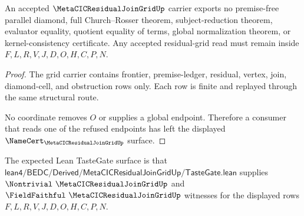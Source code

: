\begin{theorem}
\label{thm:metacic-residual-join-grid-nonescape}
An accepted $\MetaCICResidualJoinGridUp$ carrier exports no premise-free parallel diamond, full Church--Rosser theorem, subject-reduction theorem, evaluator equality, quotient equality of terms, global normalization theorem, or kernel-consistency certificate. Any accepted residual-grid read must remain inside $F,L,R,V,J,D,O,H,C,P,N$.
\end{theorem}
\begin{proof}
The grid carrier contains frontier, premise-ledger, residual, vertex, join, diamond-cell, and obstruction rows only. Each row is finite and replayed through the same structural route.

No coordinate removes $O$ or supplies a global endpoint. Therefore a consumer that reads one of the refused endpoints has left the displayed $\NameCert_{\MetaCICResidualJoinGridUp}$ surface.
\end{proof}



The expected Lean TasteGate surface is that $\mathsf{lean4/BEDC/Derived/MetaCICResidualJoinGridUp/TasteGate.lean}$ supplies $\Nontrivial\ \MetaCICResidualJoinGridUp$ and $\FieldFaithful\ \MetaCICResidualJoinGridUp$ witnesses for the displayed rows $F,L,R,V,J,D,O,H,C,P,N$.


